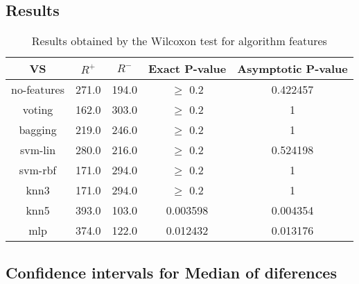 \documentclass[a4paper,10pt]{article}
\begin{document}
\subsection{Results}

\begin{table}[!htp]
\centering\small
\begin{tabular}{
|c|c|c|c|c|}
\hline
 VS & $R^{+}$ & $R^{-}$ & Exact P-value & Asymptotic P-value \\ \hline 
no-features & 271.0 & 194.0 & $\geq$ 0.2 & 0.422457\\ \hline 
voting & 162.0 & 303.0 & $\geq$ 0.2 & 1\\ \hline 
bagging & 219.0 & 246.0 & $\geq$ 0.2 & 1\\ \hline 
svm-lin & 280.0 & 216.0 & $\geq$ 0.2 & 0.524198\\ \hline 
svm-rbf & 171.0 & 294.0 & $\geq$ 0.2 & 1\\ \hline 
knn3 & 171.0 & 294.0 & $\geq$ 0.2 & 1\\ \hline 
knn5 & 393.0 & 103.0 & 0.003598 & 0.004354\\ \hline 
mlp & 374.0 & 122.0 & 0.012432 & 0.013176\\ \hline 

\end{tabular}
\caption{Results obtained by the Wilcoxon test for algorithm features}
\end{table}

\subsection{Confidence intervals for Median of diferences}
\end{document}
